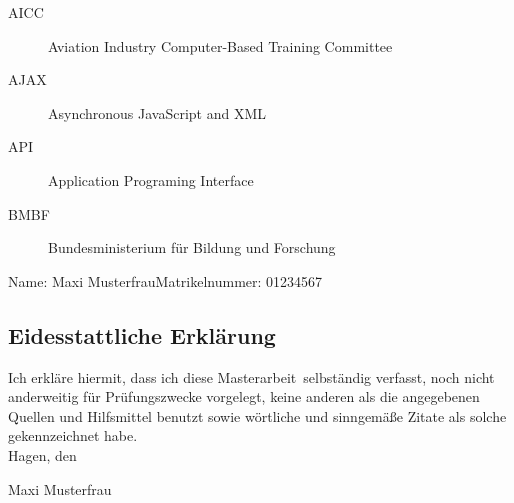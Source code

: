 \documentclass[twoside,bibliography=totoc,openany]{fumi}
\newcommand{\thesisauthor}{Maxi Musterfrau}
\newcommand{\thesistype}{Masterarbeit} %
\newcommand{\thesismatrikelnummer}{01234567}
\begin{document}
\begin{description}
\item[AICC] Aviation Industry Computer-Based Training Committee
\item[AJAX] Asynchronous JavaScript and XML
\item[API] Application Programing Interface
\item[BMBF] Bundesministerium für Bildung und Forschung
\end{description}
\cleardoublepage


Name: \thesisauthor \hfill Matrikelnummer: \thesismatrikelnummer \vspace{2cm}
\subsection*{Eidesstattliche Erklärung}
Ich erkläre hiermit, dass ich diese \thesistype~selbständig verfasst, noch nicht anderweitig für Prüfungszwecke vorgelegt, keine anderen als die angegebenen Quellen und Hilfsmittel benutzt sowie wörtliche und sinngemäße Zitate als solche gekennzeichnet habe.\\[1cm]
Hagen, den \dotfill

\hspace{2cm}{\footnotesize Datum}\hspace{5cm} {\footnotesize \thesisauthor}
\end{document}
